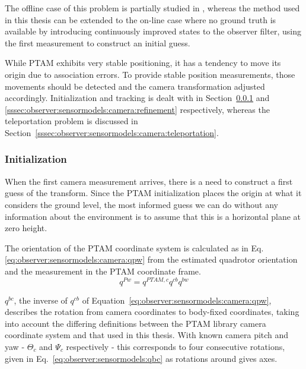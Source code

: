     The offline case of this problem is partially studied in \citep{hayashi2010},
    whereas the method used in this thesis can be extended to the on-line
    case where no ground truth is available by introducing continuously improved
    states to the observer filter, using the first measurement to construct
    an initial guess.

    While PTAM exhibits very stable positioning, it has a tendency to move
    its origin due to association errors. To provide stable position
    measurements, those movements should be detected and the
    camera transformation adjusted accordingly.
    Initialization and tracking is dealt with in
    Section~\ref{sssec:observer:sensormodels:camera:initialization} and \ref{sssec:observer:sensormodels:camera:refinement}
    respectively, whereas the teleportation problem is discussed in
    Section~\ref{sssec:observer:sensormodels:camera:teleportation}.

    \subsubsection{Initialization}
        \label{sssec:observer:sensormodels:camera:initialization}
        When the first camera measurement arrives, there is a need to construct a
        first guess of the transform. Since the PTAM initialization places
        the origin at what it considers the ground level, the most informed
        guess we can do without any information about the environment is
        to assume that this is a horizontal plane at zero height.

        The orientation of the PTAM coordinate system is calculated as in Eq. \eqref{eq:observer:sensormodels:camera:qpw}
        from the estimated quadrotor orientation and the measurement in the
        PTAM coordinate frame.
        \begin{equation}
            \label{eq:observer:sensormodels:camera:qpw}
            q^{Pw} = q^{PTAM,c} q^{cb} q^{bw}
        \end{equation}

        $q^{bc}$, the inverse of $q^{cb}$ of Equation~\ref{eq:observer:sensormodels:camera:qpw},
        describes the rotation from camera coordinates to body-fixed coordinates, taking
        into account the differing definitions between the PTAM library
        camera coordinate system and that used in this thesis.
        With known camera pitch and yaw - $\Theta_{c}$ and $\Psi_{c}$ respectively -
        this  corresponds to four consecutive rotations, given in
        Eq.~\eqref{eq:observer:sensormodels:qbc} as rotations around gives axes.

